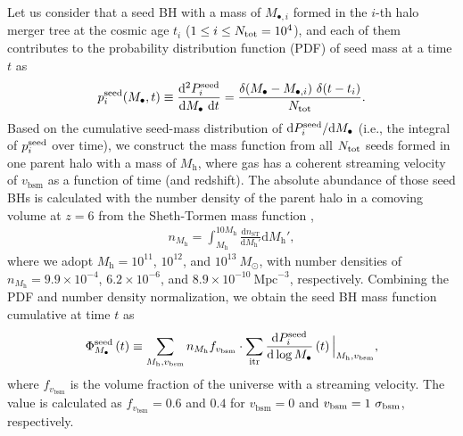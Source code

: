 \documentclass[twocolumn, twocolappendix]{aastex63}
\newcommand{\Msun}{M_\odot}
\newcommand{\Mh}{M_\mathrm{h}}
\newcommand{\Mbh}{M_\bullet}
\newcommand{\vbsm}{v_\mathrm{bsm}}
\newcommand{\D}{\mathrm{d}}
\begin{document}
\begin{CJK*}{UTF8}{gbsn}
Let us consider that a seed BH with a mass of $M_{\bullet,i}$ formed in the $i$-th halo merger tree at the cosmic age 
$t_i$ ($1\leq i \leq N_{\rm tot}=10^4$),
and each of them contributes to the probability distribution function (PDF) of seed mass at a time $t$ as
% 
\begin{equation}
  p^{\rm seed}_i (\Mbh,t)\equiv \frac{\D^2 P^{\rm seed}_i}{\D \Mbh ~\D t}= \frac{ \delta(\Mbh-M_{\bullet,i})~ \delta(t-t_i)}{N_{\rm tot}}.
\end{equation}
%
Based on the cumulative seed-mass distribution of $\D P^{\rm seed}_i/ \D \Mbh$
(i.e., the integral of $p^{\rm seed}_i$ over time),
we construct the mass function from all $N_{\rm tot}$ seeds formed in one parent halo
with a mass of $\Mh$, where gas has a coherent streaming velocity of $\vbsm$ as a function of time (and redshift).
The absolute abundance of those seed BHs is calculated with the number density of the parent halo in a comoving volume at $z=6$ 
from the Sheth-Tormen mass function \citep{2001MNRAS.323....1S},
%
\begin{align}
  n_{\Mh}= \int_{\Mh}^{10\Mh}  \frac{\D n_{\mathrm{ST}}} {\D \Mh'} \D \Mh', 
\end{align}
%
where we adopt $\Mh = 10^{11}$, $10^{12}$, and $10^{13}~\Msun$, with number densities of
$n_{\Mh} = 9.9\times 10^{-4}$, $6.2\times 10^{-6}$, and $8.9\times 10^{-10}~ \text{Mpc}^{-3}$, respectively.
Combining the PDF and number density normalization, we obtain the seed BH mass function cumulative at time $t$ as
%
\begin{align}
\Phi_{\Mbh}^{\rm seed}\left(t\right) \equiv \sum_{\Mh, \vbsm} n_{\Mh} f_{\vbsm} 
\cdot \sum_{\rm itr} \frac{\D P^{\rm seed}_i}{\D \log \Mbh}\left(t\right) \Big| _{\Mh, \vbsm},
\end{align}
%
where $f_{\vbsm}$ is the volume fraction of the universe with a streaming velocity.
The value is calculated as $f_{\vbsm} = 0.6$ and $0.4$ for $\vbsm = 0$ and $\vbsm=1~\sigma_{\rm bsm}$, respectively. 





\end{CJK*}
\end{document}
